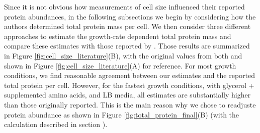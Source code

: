 \begin{figure}
\end{figure}

Since it is not obvious how measurements of cell size influenced their reported
protein abundances, in the following subsections we begin by considering how the
authors determined total protein mass per cell. We then consider three different
approaches to estimate the growth-rate dependent total protein mass and compare
these estimates with those reported by \cite{schmidt2016}. Those results are
summarized in Figure \ref{fig:cell_size_literature}(B), with the original values from both
\cite{schmidt2016} and \cite{li2014} shown in Figure \ref{fig:cell_size_literature}(A) for
reference. For most growth conditions, we find reasonable agreement between  our
estimates and the reported total protein per cell. However, for the fastest
growth conditions, with glycerol + supplemented amino acids, and LB media, all
estimates are substantially higher than those originally reported. This is the
main reason why we chose to readjuste protein abundance as shown in
Figure \ref{fig:total_protein_final}(B) (with the calculation described in section
).


